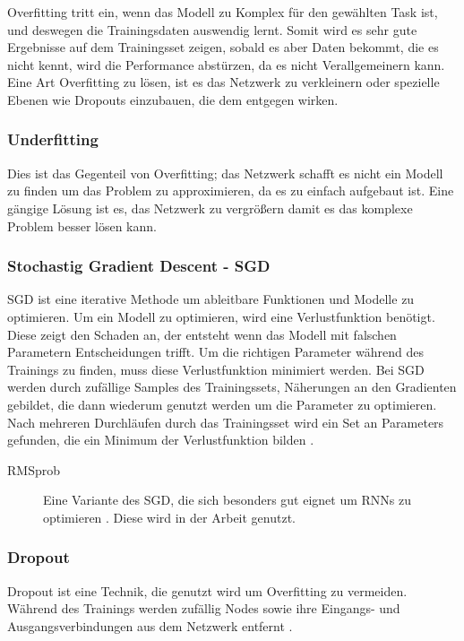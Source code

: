 \documentclass[pdftex,a4paper,halfparskip, article]{scrartcl}
\begin{document}
Overfitting tritt ein, wenn das Modell zu Komplex für den gewählten Task ist, und deswegen die Trainingsdaten auswendig lernt. Somit wird es sehr gute Ergebnisse auf dem Trainingsset zeigen, sobald es aber Daten bekommt, die es nicht kennt, wird die Performance abstürzen, da es nicht Verallgemeinern kann. Eine Art Overfitting zu lösen, ist es das Netzwerk zu verkleinern oder spezielle Ebenen wie Dropouts einzubauen, die dem entgegen wirken.

\subsubsection{Underfitting}

Dies ist das Gegenteil von Overfitting; das Netzwerk schafft es nicht ein Modell zu finden um das Problem zu approximieren, da es zu einfach aufgebaut ist. Eine gängige Lösung ist es, das Netzwerk zu vergrößern damit es das komplexe Problem besser lösen kann.


\subsubsection{Stochastig Gradient Descent - SGD}

SGD ist eine iterative Methode um ableitbare Funktionen und Modelle zu optimieren. Um ein Modell zu optimieren, wird eine Verlustfunktion benötigt. Diese zeigt den Schaden an, der entsteht wenn das Modell mit falschen Parametern Entscheidungen trifft. Um die richtigen Parameter während des Trainings zu finden, muss diese Verlustfunktion minimiert werden.
Bei SGD werden durch zufällige Samples des Trainingssets, Näherungen an den Gradienten gebildet, die dann wiederum genutzt werden um die Parameter zu optimieren. Nach mehreren Durchläufen durch das Trainingsset wird ein Set an Parameters gefunden, die ein Minimum der Verlustfunktion bilden \cite{walkSGD}. 


\begin{description}
	\item[RMSprob] Eine Variante des SGD, die sich besonders gut eignet um RNNs zu optimieren \cite{kerasDocRMSprob}. Diese wird in der Arbeit genutzt.
\end{description}

\subsubsection{Dropout}

Dropout ist eine Technik, die genutzt wird um Overfitting zu vermeiden. Während des Trainings werden zufällig Nodes sowie ihre Eingangs- und Ausgangsverbindungen aus dem Netzwerk entfernt \cite{JMLR:v15:srivastava14a}.
\end{document}
